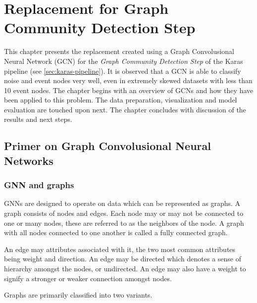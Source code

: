 
\chapter{Replacement for Graph Community Detection Step} %
\label{cha:gcd}
% 

This chapter presents the replacement created using a Graph
Convolusional Neural Network (GCN) for the \emph{Graph Community Detection
Step} of the Karas pipeline (see \ref{sec:karas-pipeline}). It is
observed that a GCN is able to classify noise and event nodes very
well, even in extremely skewed datasets with less than 10 event nodes.
The chapter begins with an overview of GCNs and how they have been
applied to this problem. The data preparation, visualization and model
evaluation are touched upon next. The chapter concludes with
discussion of the results and next steps.

\section{Primer on Graph Convolusional Neural Networks}
\label{sec:gcn-primer}

\subsection{GNN and graphs}

GNNs are designed to operate on data which can be represented as
graphs. A graph consists of nodes and edges. Each node may or may not
be connected to one or many nodes, these are referred to as the
neighbors of the node. A graph with all nodes connected to one another
is called a fully connected graph.

An edge may attributes associated with it, the two most common
attributes being weight and direction. An edge may be directed which
denotes a sense of hierarchy amongst the nodes, or undirected. An edge
may also have a weight to signify a stronger or weaker connection
amongst nodes.

Graphs are primarily classified into two variants.


